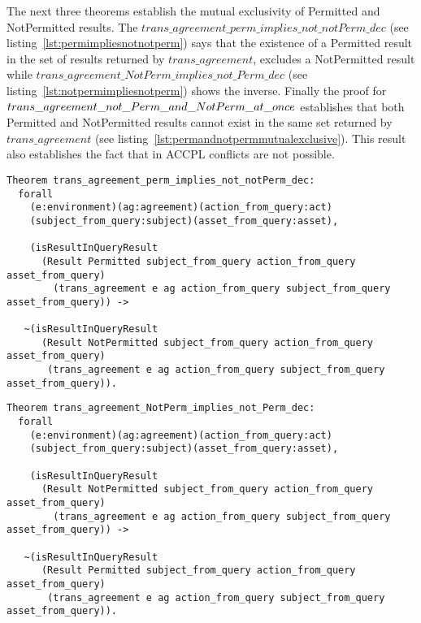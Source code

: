 The next three theorems establish the mutual exclusivity of Permitted and NotPermitted results. The $trans\_agreement\_perm\_implies\_not\_notPerm\_dec$ (see listing~\ref{lst:permimpliesnotnotperm}) says that the existence of a Permitted result in the set of results returned by $trans\_agreement$, excludes a NotPermitted result while  $trans\_agreement\_NotPerm\_implies\_not\_Perm\_dec$ (see listing~\ref{lst:notpermimpliesnotperm}) shows the inverse. Finally the proof for $trans\_agreement\_not\_Perm\_and\_ \newline NotPerm\_at\_once$ establishes that both Permitted and NotPermitted results cannot exist in the same set returned by $trans\_agreement$ (see listing~\ref{lst:permandnotpermmutualexclusive}). This result also establishes the fact that in \ac{ACCPL} conflicts are not possible.


\begin{lstlisting}
Theorem trans_agreement_perm_implies_not_notPerm_dec:
  forall
    (e:environment)(ag:agreement)(action_from_query:act)
    (subject_from_query:subject)(asset_from_query:asset),

    (isResultInQueryResult 
      (Result Permitted subject_from_query action_from_query asset_from_query)
        (trans_agreement e ag action_from_query subject_from_query asset_from_query)) ->

   ~(isResultInQueryResult 
      (Result NotPermitted subject_from_query action_from_query asset_from_query)
       (trans_agreement e ag action_from_query subject_from_query asset_from_query)).
\end{lstlisting}


\begin{lstlisting}
Theorem trans_agreement_NotPerm_implies_not_Perm_dec:
  forall
    (e:environment)(ag:agreement)(action_from_query:act)
    (subject_from_query:subject)(asset_from_query:asset),

    (isResultInQueryResult 
      (Result NotPermitted subject_from_query action_from_query asset_from_query)
        (trans_agreement e ag action_from_query subject_from_query asset_from_query)) ->

   ~(isResultInQueryResult 
      (Result Permitted subject_from_query action_from_query asset_from_query)
       (trans_agreement e ag action_from_query subject_from_query asset_from_query)).
\end{lstlisting}


